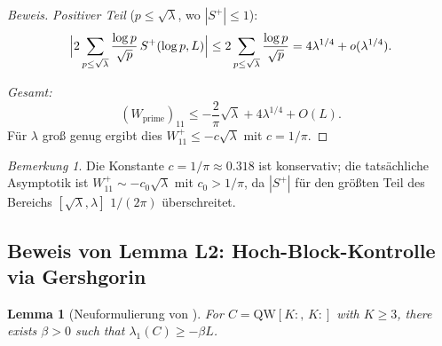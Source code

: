 ﻿\documentclass[12pt,a4paper]{article}
\newtheorem{lemma}[theorem]{Lemma}
\theoremstyle{definition}
\theoremstyle{remark}
\newtheorem{remark}[theorem]{Bemerkung}
\begin{document}
\begin{proof}[Beweis]
\emph{Positiver Teil} ($p \leq \sqrt{\lambda}$, wo $|S^+| \leq 1$):
\[
  \Bigl|2\sum_{p \leq \sqrt{\lambda}}\frac{\log p}{\sqrt{p}}\,S^+(\log p, L)\Bigr|
  \leq 2\sum_{p \leq \sqrt{\lambda}}\frac{\log p}{\sqrt{p}} = 4\lambda^{1/4} + o(\lambda^{1/4}).
\]

\emph{Gesamt:}
\[
  (W_{\mathrm{prime}})_{11} \leq -\frac{2}{\pi}\sqrt{\lambda} + 4\lambda^{1/4} + O(L).
\]
Für $\lambda$ groß genug ergibt dies $W_{11}^+ \leq -c\sqrt{\lambda}$ mit $c = 1/\pi$.
\end{proof}

\begin{remark}
Die Konstante $c = 1/\pi \approx 0.318$ ist konservativ; die tatsächliche Asymptotik ist $W_{11}^+ \sim -c_0\sqrt{\lambda}$ mit $c_0 > 1/\pi$, da $|S^+|$ für den größten Teil des Bereichs $[\sqrt{\lambda}, \lambda]$ $1/(2\pi)$ überschreitet.
\end{remark}

\subsection{Beweis von Lemma L2: Hoch-Block-Kontrolle via Gershgorin}

\begin{lemma}[Neuformulierung von ]
For $C = \mathrm{QW}[K{:},\,K{:}]$ with $K \geq 3$, there exists $\beta > 0$ such that $\lambda_1(C) \geq -\beta L$.
\end{lemma}
\end{document}
